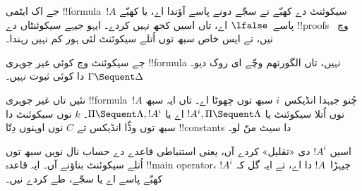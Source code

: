 \documentclass[../../../include/open-logic-section]{subfiles}
\begin{document}
جے اک ایٹمی !!{formula}~$!A$ سیکوئنٹ دے کھبّے تے سجّے دونے پاسے آؤندا اے، یا کھبّے پاسے~$\lfalse$ اے، تاں اسیں کجھ نہیں کردے۔ ایہو جیہے سیکوئنٹاں دے !!{proof}s~ وچ نیں، تے ایس خاص سبھ توں اُتلے سیکوئنٹ لئی ہور کم نہیں رہندا۔

جے سیکوئنٹ وچ کوئی غیر جوہری !!{formula} نہیں، تاں الگورتھم وچّے ای روک دیو۔ $\Gamma \Sequent \Delta$ دا کوئی ثبوت نہیں۔

نئیں تاں غیر جوہری !!{formula}~$!A$ چُنو جیہدا انڈیکس~$i$ سبھ توں چھوٹا اے۔ تاں ایہ سبھ توں اُتلا سیکوئنٹ یا $!A^i, \Pi
\Sequent \Lambda$ اے یا $ \Pi \Sequent \Lambda, !A^i$۔ $k$ نوں سیکوئنٹ دا سبھ توں وڈّا انڈیکس تے $C$ نوں اوہنوں دِتّا !!{constant}s دا سیٹ منّ لو۔

اسیں $!A^i$ دی «تقلیل» کردے آں، یعنی استنباطی قاعدے دے حساب نال نویں سبھ توں اُتلے سیکوئنٹ بناؤنے آں۔ ایہ قاعدہ !!{main operator}، جیہڑا~$!A$ دا اے، تے ایہ گل کہ $!A^i$ کھبّے پاسے اے یا سجّے، طے کردے نیں۔
\end{document}
